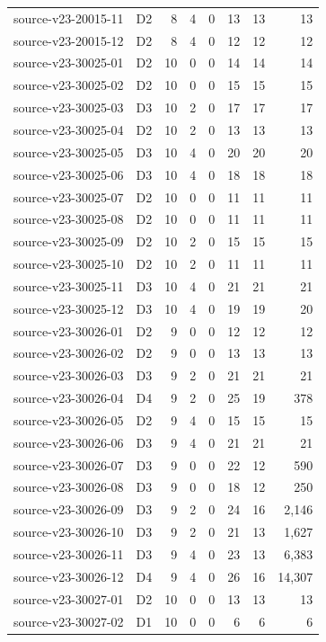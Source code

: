 \begin{longtable}{p{}lrrrrrr}
source-v23-20015-11 & D2 & 8 & 4 & 0 & 13 & 13 & 13\\
source-v23-20015-12 & D2 & 8 & 4 & 0 & 12 & 12 & 12\\
source-v23-30025-01 & D2 & 10 & 0 & 0 & 14 & 14 & 14\\
source-v23-30025-02 & D2 & 10 & 0 & 0 & 15 & 15 & 15\\
source-v23-30025-03 & D3 & 10 & 2 & 0 & 17 & 17 & 17\\
source-v23-30025-04 & D2 & 10 & 2 & 0 & 13 & 13 & 13\\
source-v23-30025-05 & D3 & 10 & 4 & 0 & 20 & 20 & 20\\
source-v23-30025-06 & D3 & 10 & 4 & 0 & 18 & 18 & 18\\
source-v23-30025-07 & D2 & 10 & 0 & 0 & 11 & 11 & 11\\
source-v23-30025-08 & D2 & 10 & 0 & 0 & 11 & 11 & 11\\
source-v23-30025-09 & D2 & 10 & 2 & 0 & 15 & 15 & 15\\
source-v23-30025-10 & D2 & 10 & 2 & 0 & 11 & 11 & 11\\
source-v23-30025-11 & D3 & 10 & 4 & 0 & 21 & 21 & 21\\
source-v23-30025-12 & D3 & 10 & 4 & 0 & 19 & 19 & 20\\
source-v23-30026-01 & D2 & 9 & 0 & 0 & 12 & 12 & 12\\
source-v23-30026-02 & D2 & 9 & 0 & 0 & 13 & 13 & 13\\
source-v23-30026-03 & D3 & 9 & 2 & 0 & 21 & 21 & 21\\
source-v23-30026-04 & D4 & 9 & 2 & 0 & 25 & 19 & 378\\
source-v23-30026-05 & D2 & 9 & 4 & 0 & 15 & 15 & 15\\
source-v23-30026-06 & D3 & 9 & 4 & 0 & 21 & 21 & 21\\
source-v23-30026-07 & D3 & 9 & 0 & 0 & 22 & 12 & 590\\
source-v23-30026-08 & D3 & 9 & 0 & 0 & 18 & 12 & 250\\
source-v23-30026-09 & D3 & 9 & 2 & 0 & 24 & 16 & 2,146\\
source-v23-30026-10 & D3 & 9 & 2 & 0 & 21 & 13 & 1,627\\
source-v23-30026-11 & D3 & 9 & 4 & 0 & 23 & 13 & 6,383\\
source-v23-30026-12 & D4 & 9 & 4 & 0 & 26 & 16 & 14,307\\
source-v23-30027-01 & D2 & 10 & 0 & 0 & 13 & 13 & 13\\
source-v23-30027-02 & D1 & 10 & 0 & 0 & 6 & 6 & 6\\

\end{longtable}

